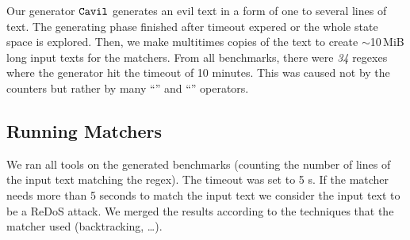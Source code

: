 \documentclass[acmsmall,screen]{acmart}
\begin{document}
Our generator $\texttt{Cavil}$ generates an evil text in a form of one to several lines of text. 
%
The generating phase finished after timeout expered or the whole state space is explored.
%
Then, we make multitimes copies of the text to create $\sim$10\,MiB long
 input texts for the matchers.
%
From all benchmarks, there were \emph{34} regexes where the generator hit the timeout of 10 minutes.
%
This was caused not by the counters but rather by many ``\regex{|}'' and ``'' operators.    



\subsection{Running Matchers}
We ran all tools on the generated benchmarks (counting the number of lines of
the input text matching the regex).
%
The timeout was set to 5 s. If the matcher needs more than 5 seconds to match the input text
%
we consider the input text to be a ReDoS attack.
%
We merged the results according to the techniques that the matcher used (backtracking, \dots).
%


\end{document}
